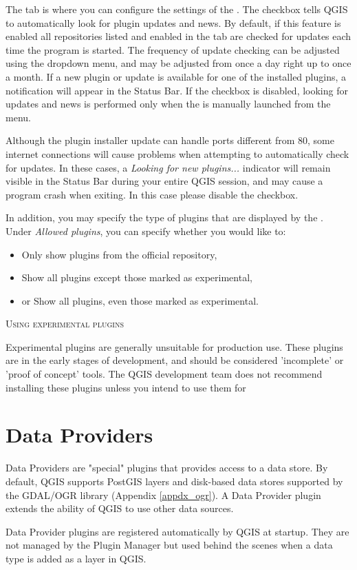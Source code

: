 
The  tab is where you can configure the settings of the . The  checkbox tells QGIS to automatically look for plugin updates and news. By default, if this feature is enabled all repositories listed and enabled in the  tab are checked for updates each time the program is started. The frequency of update checking can be adjusted using the dropdown menu, and may be adjusted from once a day right up to once a month. If a new plugin or update is available for one of the installed plugins, a notification will appear in the Status Bar. If the checkbox is disabled, looking for updates and news is performed only when the  is manually launched from the menu.

Although the plugin installer update can handle ports different from 80, some internet
connections will cause problems when attempting to automatically check for updates.
In these cases, a \textit{Looking for new plugins...} indicator will
remain visible in the Status Bar during your entire QGIS session, and may cause a
program crash when exiting. In this case please disable the checkbox.

In addition, you may specify the type of plugins that are displayed by the . Under \textit{Allowed plugins}, you can specify whether you would like to:

\begin{itemize}[label=--]
\item Only show plugins from the official repository,
\item Show all plugins except those marked as experimental,
\item or Show all plugins, even those marked as experimental.
\end{itemize}

\begin{Tip}
 \caption{\textsc{Using experimental plugins}}
Experimental plugins are generally unsuitable for production use. These plugins are in the early stages of development, and should be considered 'incomplete' or 'proof of concept' tools. The QGIS development team does not recommend installing these plugins unless you intend to use them for
\end{Tip}

\section{Data Providers}

Data Providers are "special" plugins that provides access to a data store.
By default, QGIS supports PostGIS layers and disk-based data stores supported by the GDAL/OGR library (Appendix \ref{appdx_ogr}).
A Data Provider plugin extends the ability of QGIS to use other data sources.

Data Provider plugins are registered automatically by QGIS at startup.
They are not managed by the Plugin Manager but used behind the scenes when a data type is added as a layer in QGIS.

\FloatBarrier
